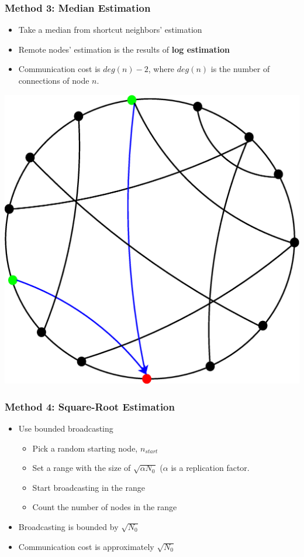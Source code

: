\documentclass[red]{beamer}
\begin{document}
\begin{frame}
\frametitle{Method 3: Median Estimation}
\begin{minipage}{5cm}
\begin{itemize}
\item Take a median from shortcut neighbors' estimation
\item Remote nodes' estimation is the results of \textbf{log estimation} 
\item Communication cost is $deg(n)-2$, where $deg(n)$ is the number of connections of node $n$.
\end{itemize}
\end{minipage}
\begin{minipage}{5cm}
\centering
\includegraphics[scale=0.2]{figs/method3}
\end{minipage}
\end{frame}
\begin{frame}
\frametitle{Method 4: Square-Root Estimation}
\begin{itemize}
\item Use bounded broadcasting
\begin{itemize}
\item Pick a random starting node, $n_{start}$
\item Set a range with the size of $\sqrt{\alpha N_0}$ ($\alpha$ is a replication factor.
\item Start broadcasting in the range
\item Count the number of nodes in the range
\end{itemize}
\item Broadcasting is bounded by $\sqrt{N_0}$
\item Communication cost is approximately $\sqrt{N_0}$ 
\end{itemize}
\end{frame}
\end{document}
